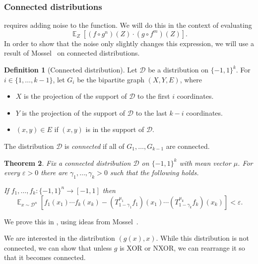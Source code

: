 \documentclass{article}
\newtheorem{theorem}{Theorem}[section]
\theoremstyle{definition}
\newtheorem{definition}[theorem]{Definition}
\theoremstyle{remark}
\DeclareMathOperator*{\E}{\mathbb{E}}
\newcommand\eps{\varepsilon}
\renewcommand\epsilon{\eps}
\begin{document}
\subsubsection{Connected distributions}

 requires adding noise to the function. We will do this in the context of evaluating
\[
 \E_Z[(f \circ g^n)(Z) \cdot (g \circ f^m)(Z)].
\]
In order to show that the noise only slightly changes this expression, we will use a result of Mossel~\cite{Mossel2010} on connected distributions.

\begin{definition}[Connected distribution]
\label{def:connected-space}
Let $\mathcal{D}$ be a distribution on $\{-1,1\}^k$. For $i \in \{1,\ldots,k-1\}$, let $G_i$ be the bipartite graph $(X,Y,E)$, where
\begin{itemize}
    \item $X$ is the projection of the support of $\mathcal{D}$ to the first $i$ coordinates.
    \item $Y$ is the projection of the support of $\mathcal{D}$ to the last $k-i$ coordinates.
    \item $(x,y) \in E$ if $(x,y)$ is in the support of $\mathcal{D}$.
\end{itemize}
The distribution $\mathcal{D}$ is \emph{connected} if all of $G_1,\ldots,G_{k-1}$ are connected.
\end{definition}

\begin{theorem} \label{thm:connected}
Fix a connected distribution $\mathcal{D}$ on $\{-1,1\}^k$ with mean vector $\mu$. For every $\epsilon > 0$ there are $\gamma_1,\ldots,\gamma_k > 0$ such that the following holds.

If $f_1,\ldots,f_k\colon \{-1,1\}^n \to [-1,1]$ then
\[
 \E_{x \sim \mathcal{D}^n}[f_1(x_1) \cdots f_k(x_k) - (T_{1-\gamma_1}^{\mu_1} f_1)(x_1) \cdots (T_{1-\gamma_k}^{\mu_k} f_k)(x_k)] < \epsilon.
\]
\end{theorem}

We prove this in , using ideas from Mossel~\cite{Mossel2010}. 

We are interested in the distribution $(g(x),x)$. While this distribution is not connected, we can show that unless $g$ is XOR or NXOR, we can rearrange it so that it becomes connected.
\end{document}
